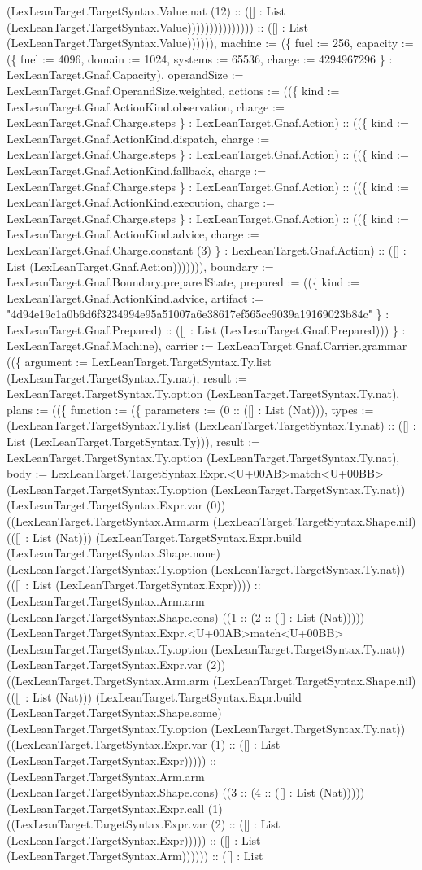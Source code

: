\documentclass[11pt]{article}
\begin{document}
(LexLeanTarget.TargetSyntax.Value.nat (12) :: ([] : List (LexLeanTarget.TargetSyntax.Value))))))))))))))) :: ([] : List (LexLeanTarget.TargetSyntax.Value)))))), machine := (\{ fuel := 256, capacity := (\{ fuel := 4096, domain := 1024, systems := 65536, charge := 4294967296 \} : LexLeanTarget.Gnaf.Capacity), operandSize := LexLeanTarget.Gnaf.OperandSize.weighted, actions := ((\{ kind := LexLeanTarget.Gnaf.ActionKind.observation, charge := LexLeanTarget.Gnaf.Charge.steps \} : LexLeanTarget.Gnaf.Action) :: ((\{ kind := LexLeanTarget.Gnaf.ActionKind.dispatch, charge := LexLeanTarget.Gnaf.Charge.steps \} : LexLeanTarget.Gnaf.Action) :: ((\{ kind := LexLeanTarget.Gnaf.ActionKind.fallback, charge := LexLeanTarget.Gnaf.Charge.steps \} : LexLeanTarget.Gnaf.Action) :: ((\{ kind := LexLeanTarget.Gnaf.ActionKind.execution, charge := LexLeanTarget.Gnaf.Charge.steps \} : LexLeanTarget.Gnaf.Action) :: ((\{ kind := LexLeanTarget.Gnaf.ActionKind.advice, charge := LexLeanTarget.Gnaf.Charge.constant (3) \} : LexLeanTarget.Gnaf.Action) :: ([] : List (LexLeanTarget.Gnaf.Action))))))), boundary := LexLeanTarget.Gnaf.Boundary.preparedState, prepared := ((\{ kind := LexLeanTarget.Gnaf.ActionKind.advice, artifact := "4d94e19c1a0b6d6f3234994e95a51007a6e38617ef565cc9039a19169023b84c" \} : LexLeanTarget.Gnaf.Prepared) :: ([] : List (LexLeanTarget.Gnaf.Prepared))) \} : LexLeanTarget.Gnaf.Machine), carrier := LexLeanTarget.Gnaf.Carrier.grammar ((\{ argument := LexLeanTarget.TargetSyntax.Ty.list (LexLeanTarget.TargetSyntax.Ty.nat), result := LexLeanTarget.TargetSyntax.Ty.option (LexLeanTarget.TargetSyntax.Ty.nat), plans := ((\{ function := (\{ parameters := (0 :: ([] : List (Nat))), types := (LexLeanTarget.TargetSyntax.Ty.list (LexLeanTarget.TargetSyntax.Ty.nat) :: ([] : List (LexLeanTarget.TargetSyntax.Ty))), result := LexLeanTarget.TargetSyntax.Ty.option (LexLeanTarget.TargetSyntax.Ty.nat), body := LexLeanTarget.TargetSyntax.Expr.<U+00AB>match<U+00BB> (LexLeanTarget.TargetSyntax.Ty.option (LexLeanTarget.TargetSyntax.Ty.nat)) (LexLeanTarget.TargetSyntax.Expr.var (0)) ((LexLeanTarget.TargetSyntax.Arm.arm (LexLeanTarget.TargetSyntax.Shape.nil) (([] : List (Nat))) (LexLeanTarget.TargetSyntax.Expr.build (LexLeanTarget.TargetSyntax.Shape.none) (LexLeanTarget.TargetSyntax.Ty.option (LexLeanTarget.TargetSyntax.Ty.nat)) (([] : List (LexLeanTarget.TargetSyntax.Expr)))) :: (LexLeanTarget.TargetSyntax.Arm.arm (LexLeanTarget.TargetSyntax.Shape.cons) ((1 :: (2 :: ([] : List (Nat))))) (LexLeanTarget.TargetSyntax.Expr.<U+00AB>match<U+00BB> (LexLeanTarget.TargetSyntax.Ty.option (LexLeanTarget.TargetSyntax.Ty.nat)) (LexLeanTarget.TargetSyntax.Expr.var (2)) ((LexLeanTarget.TargetSyntax.Arm.arm (LexLeanTarget.TargetSyntax.Shape.nil) (([] : List (Nat))) (LexLeanTarget.TargetSyntax.Expr.build (LexLeanTarget.TargetSyntax.Shape.some) (LexLeanTarget.TargetSyntax.Ty.option (LexLeanTarget.TargetSyntax.Ty.nat)) ((LexLeanTarget.TargetSyntax.Expr.var (1) :: ([] : List (LexLeanTarget.TargetSyntax.Expr))))) :: (LexLeanTarget.TargetSyntax.Arm.arm (LexLeanTarget.TargetSyntax.Shape.cons) ((3 :: (4 :: ([] : List (Nat))))) (LexLeanTarget.TargetSyntax.Expr.call (1) ((LexLeanTarget.TargetSyntax.Expr.var (2) :: ([] : List (LexLeanTarget.TargetSyntax.Expr))))) :: ([] : List (LexLeanTarget.TargetSyntax.Arm)))))) :: ([] : List 
\end{document}
